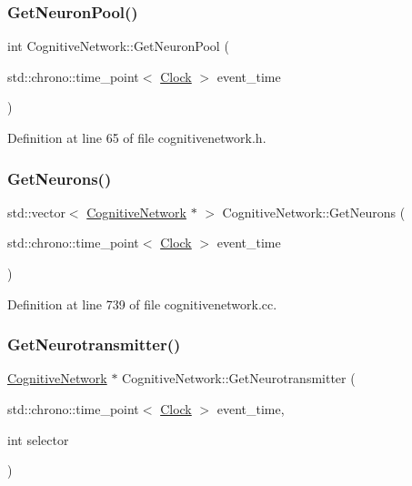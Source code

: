 \subsubsection{\texorpdfstring{Get\+Neuron\+Pool()}{GetNeuronPool()}}
{\footnotesize\ttfamily int Cognitive\+Network\+::\+Get\+Neuron\+Pool (\begin{DoxyParamCaption}\item[{std\+::chrono\+::time\+\_\+point$<$ \mbox{\hyperlink{universe_8h_a0ef8d951d1ca5ab3cfaf7ab4c7a6fd80}{Clock}} $>$}]{event\+\_\+time }\end{DoxyParamCaption})\hspace{0.3cm}{\ttfamily [inline]}}



Definition at line 65 of file cognitivenetwork.\+h.

\mbox{\label{class_cognitive_network_a0e9e37e976a7ca5ee625e2d7b36fd7ea}} 
\subsubsection{\texorpdfstring{Get\+Neurons()}{GetNeurons()}}
{\footnotesize\ttfamily std\+::vector$<$ \mbox{\hyperlink{class_cognitive_network}{Cognitive\+Network}} $\ast$ $>$ Cognitive\+Network\+::\+Get\+Neurons (\begin{DoxyParamCaption}\item[{std\+::chrono\+::time\+\_\+point$<$ \mbox{\hyperlink{universe_8h_a0ef8d951d1ca5ab3cfaf7ab4c7a6fd80}{Clock}} $>$}]{event\+\_\+time }\end{DoxyParamCaption})}



Definition at line 739 of file cognitivenetwork.\+cc.

\mbox{\label{class_cognitive_network_a85890c201376061b1ffbe8fdfc1a8633}} 
\subsubsection{\texorpdfstring{Get\+Neurotransmitter()}{GetNeurotransmitter()}}
{\footnotesize\ttfamily \mbox{\hyperlink{class_cognitive_network}{Cognitive\+Network}} $\ast$ Cognitive\+Network\+::\+Get\+Neurotransmitter (\begin{DoxyParamCaption}\item[{std\+::chrono\+::time\+\_\+point$<$ \mbox{\hyperlink{universe_8h_a0ef8d951d1ca5ab3cfaf7ab4c7a6fd80}{Clock}} $>$}]{event\+\_\+time,  }\item[{int}]{selector }\end{DoxyParamCaption})}



